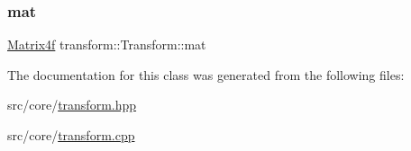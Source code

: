 \mbox{\label{classtransform_1_1Transform_ad214be4833e197c9e91465c4a6a977ec}} 
\subsubsection{\texorpdfstring{mat}{mat}}
{\footnotesize\ttfamily \mbox{\hyperlink{cyclop_8hpp_a65205693559e288093427c05b128827f}{Matrix4f}} transform\+::\+Transform\+::mat}



The documentation for this class was generated from the following files\+:\begin{DoxyCompactItemize}
\item 
src/core/\mbox{\hyperlink{transform_8hpp}{transform.\+hpp}}\item 
src/core/\mbox{\hyperlink{transform_8cpp}{transform.\+cpp}}\end{DoxyCompactItemize}
